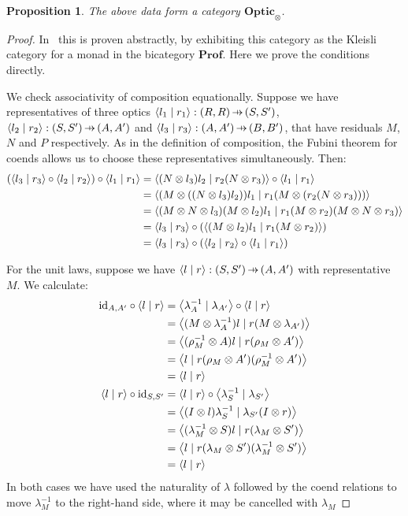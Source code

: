 \documentclass[11pt,letterpaper]{article}
\theoremstyle{plain}
\newtheorem{proposition}[theorem]{Proposition}
\theoremstyle{definition}
\newcommand{\Prof}{\mathbf{Prof}}
\newcommand{\Optic}{\mathbf{Optic}}
\newcommand{\id}{\mathrm{id}}
\newcommand{\rep}[2]{{\ensuremath \left\langle #1 \mid #2 \right\rangle}}
\newcommand{\hto}{\ensuremath{\,\mathaccent\shortmid\rightarrow\,}}
\begin{document}
\begin{proposition}\label{prop:optic-is-cat}
  The above data form a category $\Optic_\otimes$.
\end{proposition}
\begin{proof}
  In~\cite[Section 6]{Doubles} this is proven abstractly, by exhibiting this category as the Kleisli category for a monad in the bicategory $\Prof$. Here we prove the conditions directly.

  We check associativity of composition equationally.  Suppose we have representatives of three optics $\rep{l_1}{r_1} : (R, R) \hto (S, S')$, $\rep{l_2}{r_2} : (S, S') \hto (A, A')$ and $\rep{l_3}{r_3} : (A, A') \hto (B, B')$, that have residuals $M$, $N$ and $P$ respectively. As in the definition of composition, the Fubini theorem for coends allows us to choose these representatives simultaneously. Then:
  \begin{align*}
    (\rep{l_3}{r_3} \circ \rep{l_2}{r_2}) \circ \rep{l_1}{r_1}
    &= \rep{(N \otimes l_3)l_2}{r_2(N \otimes r_3)} \circ \rep{l_1}{r_1} \\
    &= \rep{(M \otimes ((N \otimes l_3)l_2))l_1}{r_1(M \otimes (r_2(N \otimes r_3)))} \\
    &= \rep{(M \otimes N \otimes l_3)(M \otimes l_2)l_1}{r_1(M \otimes r_2)(M \otimes N \otimes r_3)} \\
    &= \rep{l_3}{r_3} \circ (\rep{(M \otimes l_2)l_1}{r_1(M \otimes r_2)}) \\
    &= \rep{l_3}{r_3} \circ (\rep{l_2}{r_2} \circ \rep{l_1}{r_1})
  \end{align*}

  For the unit laws, suppose we have $\rep{l}{r} : (S, S') \hto (A, A')$ with representative $M$. We calculate:
  \begin{align*}
    \id_{A, A'} \circ \rep{l}{r}
    &= \rep{\lambda^{-1}_A}{\lambda_{A'}} \circ \rep{l}{r} \\
    &= \rep{(M \otimes \lambda^{-1}_A) l}{r (M \otimes  \lambda_{A'})} \\
    &= \rep{(\rho^{-1}_M \otimes  A) l}{r (\rho_M \otimes A')} \\
    &= \rep{l}{r (\rho_M \otimes A') (\rho^{-1}_M \otimes A')} \\
    &= \rep{l}{r} \\
    \rep{l}{r} \circ \id_{S, S'}
    &= \rep{l}{r} \circ \rep{\lambda^{-1}_S}{\lambda_{S'}}  \\
    &= \rep{(I \otimes l)\lambda^{-1}_S}{\lambda_{S'} (I \otimes r)} \\
    &= \rep{(\lambda^{-1}_M \otimes S)l}{r (\lambda_{M} \otimes S')} \\
    &= \rep{l}{r (\lambda_{M} \otimes S')(\lambda^{-1}_M \otimes S')} \\
    &= \rep{l}{r}
  \end{align*}
  In both cases we have used the naturality of $\lambda$ followed by the coend relations to move $\lambda^{-1}_M$ to the right-hand side, where it may be cancelled with $\lambda_M$
\end{proof}
\end{document}
